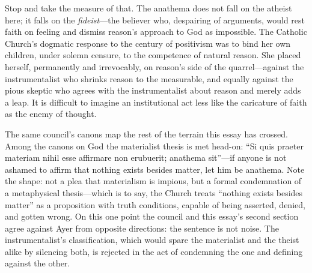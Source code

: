 Stop and take the measure of that. The anathema does not fall on the atheist here; it falls on the \emph{fideist}---the believer who, despairing of arguments, would rest faith on feeling and dismiss reason's approach to God as impossible. The Catholic Church's dogmatic response to the century of positivism was to bind her own children, under solemn censure, to the competence of natural reason. She placed herself, permanently and irrevocably, on reason's side of the quarrel---against the instrumentalist who shrinks reason to the measurable, and equally against the pious skeptic who agrees with the instrumentalist about reason and merely adds a leap. It is difficult to imagine an institutional act less like the caricature of faith as the enemy of thought.

The same council's canons map the rest of the terrain this essay has crossed. Among the canons on God the materialist thesis is met head-on: ``Si quis praeter materiam nihil esse affirmare non erubuerit; anathema sit''---if anyone is not ashamed to affirm that nothing exists besides matter, let him be anathema. Note the shape: not a plea that materialism is impious, but a formal condemnation of a metaphysical thesis---which is to say, the Church treats ``nothing exists besides matter'' as a proposition with truth conditions, capable of being asserted, denied, and gotten wrong. On this one point the council and this essay's second section agree against Ayer from opposite directions: the sentence is not noise. The instrumentalist's classification, which would spare the materialist and the theist alike by silencing both, is rejected in the act of condemning the one and defining against the other.


